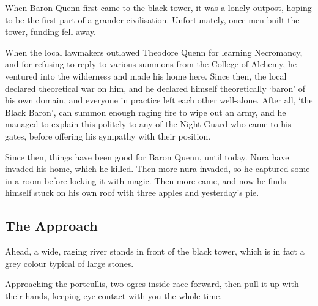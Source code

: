 \begin{multicols}{2}

\begin{exampletext}

	When Baron Quenn first came to the black tower, it was a lonely outpost, hoping to be the first part of a grander civilisation.
	Unfortunately, once men built the tower, funding fell away.

	When the local lawmakers outlawed Theodore Quenn for learning Necromancy, and for refusing to reply to various summons from the College of Alchemy, he ventured into the wilderness and made his home here.
	Since then, the local declared theoretical war on him, and he declared himself theoretically `baron' of his own domain, and everyone in practice left each other well-alone.
	After all, `the Black Baron', can summon enough raging fire to wipe out an army, and he managed to explain this politely to any of the Night Guard who came to his gates, before offering his sympathy with their position.

	Since then, things have been good for Baron Quenn, until today.
	Nura have invaded his home, which he killed.
	Then more nura invaded, so he captured some in a room before locking it with magic.
	Then more came, and now he finds himself stuck on his own roof with three apples and yesterday's pie.

\end{exampletext}



\subsection{The Approach}

\setcounter{list}{0}

\begin{boxtext}

	Ahead, a wide, raging river stands in front of the black tower, which is in fact a grey colour typical of large stones.

\end{boxtext}



\begin{boxtext}

	Approaching the portcullis, two ogres inside race forward, then pull it up with their hands, keeping eye-contact with you the whole time.


\end{boxtext}
\end{multicols}
